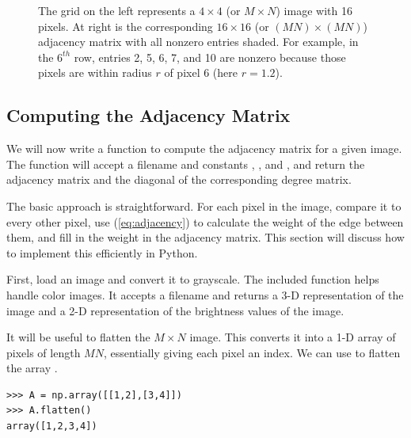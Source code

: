 \begin{figure}

\caption{The grid on the left represents a $4\times4$ (or $M \times N$) image with 16 pixels.
At right is the corresponding $16 \times 16$ (or $(MN) \times (MN)$) adjacency matrix with all nonzero entries shaded.
For example, in the $6^{th}$ row, entries 2, 5, 6, 7, and 10 are nonzero because those pixels are within radius $r$ of pixel 6 (here $r = 1.2$).}
\label{fig:adjacency}
\end{figure}


\subsection*{Computing the Adjacency Matrix}
We will now write a function to compute the adjacency matrix for a given image.
The function will accept a filename and constants , , and , and return the adjacency matrix and the diagonal of the corresponding degree matrix.

The basic approach is straightforward.
For each pixel in the image, compare it to every other pixel, use (\ref{eq:adjacency}) to calculate the weight of the edge between them, and fill in the weight in the adjacency matrix.
This section will discuss how to implement this efficiently in Python.

First, load an image and convert it to grayscale.
The included function  helps handle color images.
It accepts a filename and returns a 3-D representation of the image and a 2-D representation of the brightness values of the image.

It will be useful to flatten the $M \times N$ image.
This converts it into a 1-D array of pixels of length $MN$, essentially giving each pixel an index.
We can use  to flatten the array .
\begin{lstlisting}
>>> A = np.array([[1,2],[3,4]])
>>> A.flatten()
array([1,2,3,4])
\end{lstlisting}

